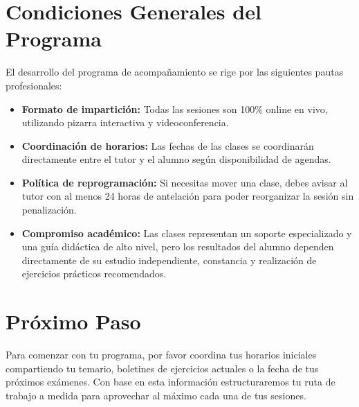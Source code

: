 \documentclass[11pt,a4paper]{article}
\begin{document}
\section{Condiciones Generales del Programa}
El desarrollo del programa de acompañamiento se rige por las siguientes pautas profesionales:
\begin{itemize}
    \item \textbf{Formato de impartición:} Todas las sesiones son 100\% online en vivo, utilizando pizarra interactiva y videoconferencia.
    \item \textbf{Coordinación de horarios:} Las fechas de las clases se coordinarán directamente entre el tutor y el alumno según disponibilidad de agendas.
    \item \textbf{Política de reprogramación:} Si necesitas mover una clase, debes avisar al tutor con al menos 24 horas de antelación para poder reorganizar la sesión sin penalización.
    \item \textbf{Compromiso académico:} Las clases representan un soporte especializado y una guía didáctica de alto nivel, pero los resultados del alumno dependen directamente de su estudio independiente, constancia y realización de ejercicios prácticos recomendados.
\end{itemize}

\section{Próximo Paso}
Para comenzar con tu programa, por favor coordina tus horarios iniciales compartiendo tu temario, boletines de ejercicios actuales o la fecha de tus próximos exámenes. Con base en esta información estructuraremos tu ruta de trabajo a medida para aprovechar al máximo cada una de tus sesiones.
\end{document}
